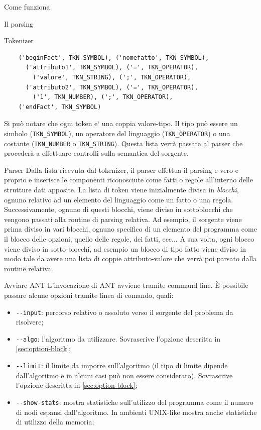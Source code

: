 \begin{chapter}{Come funziona}
\begin{section}{Il parsing}
\begin{subsection}{Tokenizer}
	\begin{verbatim}
	('beginFact', TKN_SYMBOL), ('nomefatto', TKN_SYMBOL),
	  ('attributo1', TKN_SYMBOL), ('=', TKN_OPERATOR),
	    ('valore', TKN_STRING), (';', TKN_OPERATOR),
	  ('attributo2', TKN_SYMBOL), ('=', TKN_OPERATOR),
	    ('1', TKN_NUMBER), (';', TKN_OPERATOR),
	('endFact', TKN_SYMBOL)
	\end{verbatim}

	\noindent Si pu\`o notare che ogni token e` una coppia valore-tipo. Il tipo pu\`o
	essere un simbolo (\verb,TKN_SYMBOL,), un operatore del linguaggio (\verb,TKN_OPERATOR,)
	o una costante (\verb,TKN_NUMBER, o \verb,TKN_STRING,). Questa lista verr\`a passata
	al parser che proceder\`a a effettuare controlli sulla semantica del sorgente.
	\end{subsection}
	
	\begin{subsection}{Parser}
	Dalla lista ricevuta dal tokenizer, il parser effettua il parsing e vero e proprio
	e inserisce le componenti riconosciute come fatti o regole all'interno delle strutture
	dati apposite. La lista di token viene inizialmente divisa in \textit{blocchi}, ognuno
	relativo ad un elemento del linguaggio come un fatto o una regola. Successivamente,
	ognuno di questi blocchi, viene diviso in sottoblocchi che vengono passati alla routine
	di parsing relativa. Ad esempio, il sorgente viene prima diviso in vari blocchi,
    ognuno specifico di un elemento del programma come il blocco delle opzioni, quello delle
    regole, dei fatti, ecc... A sua volta, ogni blocco viene diviso in sotto-blocchi, ad
    esempio un blocco di tipo fatto viene diviso in modo tale da avere una lista di coppie
    attributo-valore che verr\`a poi parsato dalla routine relativa.
	\end{subsection}
\end{section}

\begin{section}{Avviare ANT}
L'invocazione di ANT avviene tramite command line. \`E possibile passare alcune opzioni
tramite linea di comando, quali:

\begin{itemize}
	\item \verb,--input,: percorso relativo o assoluto verso il sorgente del problema da risolvere;
	\item \verb,--algo,: l'algoritmo da utilizzare. Sovrascrive l'opzione descritta in \ref{sec:option-block};
	\item \verb,--limit,: il limite da imporre sull'algoritmo (il tipo di limite dipende dall'algoritmo e
	in alcuni casi pu\`o non essere considerato). Sovrascrive l'opzione descritta in \ref{sec:option-block};
	\item \verb,--show-stats,: mostra statistiche sull'utilizzo del programma come il numero di nodi
	espansi dall'algoritmo. In ambienti UNIX-like mostra anche statistiche di utilizzo della memoria;
\end{itemize}


\end{section}
\end{chapter}
